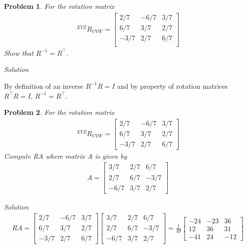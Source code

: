 \documentclass{article}
\newtheorem{prob}{Problem}
\numberwithin{prob}{section}
\newenvironment{solution}{\emph{Solution}}{}
\begin{document}
\begin{prob}
  For the rotation matrix
  \begin{align}
  ^{XYZ}R_{UVW} = \begin{bmatrix}
    2/7 & -6/7 & 3/7\\
   6/7 & 3/7 & 2/7\\
   -3/7 & 2/7 & 6/7\\
  \end{bmatrix}
\end{align}
Show that $R^{-1} = R^\top$.
\end{prob}
\begin{solution}

By definition of an inverse $R^{-1} R = I$ and by property of rotation matrices $R^\top R = I$, $R^{-1} = R^\top$.

\end{solution}
\begin{prob}
  For the rotation matrix
  \begin{align}
  ^{XYZ}R_{UVW} = \begin{bmatrix}
    2/7 & -6/7 & 3/7\\
   6/7 & 3/7 & 2/7\\
   -3/7 & 2/7 & 6/7
  \end{bmatrix}
\end{align}
Compute RA where matrix A is given by
\begin{align}
  A = \begin{bmatrix}
    3/7 & 2/7 & 6/7\\
    2/7 & 6/7 & -3/7\\
    -6/7 & 3/7 & 2/7
  \end{bmatrix}
\end{align}
\end{prob}
\begin{solution}
\begin{align}
  R A = \begin{bmatrix}
    2/7 & -6/7 & 3/7\\
   6/7 & 3/7 & 2/7\\
   -3/7 & 2/7 & 6/7
  \end{bmatrix} 
\begin{bmatrix}
    3/7 & 2/7 & 6/7\\
    2/7 & 6/7 & -3/7\\
    -6/7 & 3/7 & 2/7
    \end{bmatrix} 
    = \frac{1}{49}\begin{bmatrix}
-24& -23&  36\\
        12&  36&  31\\
       -41&  24& -12
  \end{bmatrix}
\end{align}

\end{solution}
\end{document}

